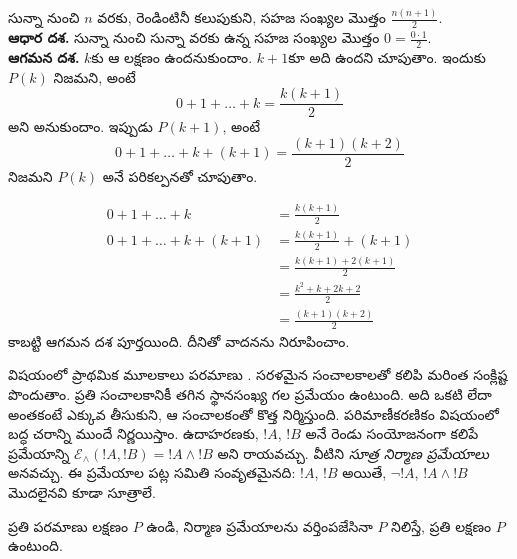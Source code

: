\documentclass[../../../include/open-logic-section]{subfiles}
\begin{document}
\begin{ex} సున్నా నుంచి $n$ వరకు, రెండింటినీ కలుపుకుని, సహజ సంఖ్యల మొత్తం $\frac{n(n+1)}{2}$. \\

\textbf{ఆధార దశ.} సున్నా నుంచి సున్నా వరకు ఉన్న సహజ సంఖ్యల మొత్తం $0=\frac{0\cdot 1}{2}$. \\

\textbf{ఆగమన దశ.} $k$కు ఆ లక్షణం ఉందనుకుందాం. $k+1$కూ అది ఉందని చూపుతాం. ఇందుకు $P(k)$ నిజమని, అంటే
\[ 0 + 1 + \ldots + k = \frac{k(k+1)}{2} \]
అని అనుకుందాం. ఇప్పుడు $P(k+1)$, అంటే
\[ 0 + 1 + \ldots + k + (k+1) = \frac{(k+1)(k+2)}{2} \]
నిజమని $P(k)$ అనే పరికల్పనతో చూపుతాం.

\begin{align*}
0 + 1 + \ldots + k &= \frac{k(k+1)}{2} \tag{పరికల్పన} \\
0 + 1 + \ldots + k + (k+1) &= \frac{k(k+1)}{2} + (k+1)
\tag{రెండు వైపులా $k+1$ కలిపాం} \\
&= \frac{k(k+1) + 2(k+1)}{2} \\
&= \frac{k^2 + k + 2k +2}{2} \\
&=\frac{(k+1)(k+2)}{2}
\end{align*}
కాబట్టి ఆగమన దశ పూర్తయింది. దీనితో వాదనను నిరూపించాం.
\end{ex}

\begin{explain}
 విషయంలో ప్రాథమిక మూలకాలు పరమాణు . సరళమైన  సంచాలకాలతో కలిపి మరింత సంక్లిష్ట  పొందుతాం. ప్రతి సంచాలకానికీ తగిన స్థానసంఖ్య గల ప్రమేయం ఉంటుంది. అది ఒకటి లేదా అంతకంటే ఎక్కువ  తీసుకుని, ఆ సంచాలకంతో కొత్త  నిర్మిస్తుంది. పరిమాణీకరణికం విషయంలో బద్ధ చరాన్ని ముందే నిర్ణయిస్తాం. ఉదాహరణకు, $!A$, $!B$ అనే రెండు  సంయోజనంగా కలిపే ప్రమేయాన్ని $\mathcal E _\land (!A, !B) = !A \land !B$ అని రాయవచ్చు. వీటిని \emph{సూత్ర నిర్మాణ ప్రమేయాలు} అనవచ్చు. ఈ ప్రమేయాల పట్ల  సమితి సంవృతమైనది: $!A$, $!B$  అయితే, $\lnot !A$, $!A \land !B$ మొదలైనవి కూడా సూత్రాలే.
\end{explain}

\begin{defn}
ప్రతి పరమాణు  లక్షణం $P$ ఉండి,  నిర్మాణ ప్రమేయాలను వర్తింపజేసినా $P$ నిలిస్తే, ప్రతి  లక్షణం $P$ ఉంటుంది.
\end{defn}
\end{document}

